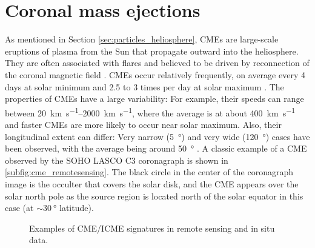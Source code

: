 \section{Coronal mass ejections}
\label{sec:cmes}

As mentioned in Section \ref{sec:particles_heliosphere}, \acp{CME} are large-scale eruptions of plasma from the Sun that propagate outward into the heliosphere. They are often associated with flares and believed to be driven by reconnection of the coronal magnetic field \citep[see e.g.][for discussions on the triggering mechanism]{Forbes-2000,Kusano-2012}. \acp{CME} occur relatively frequently, on average every 4 days at solar minimum and 2.5 to 3 times per day at solar maximum \citep{Webb-1994}. The properties of \acp{CME} have a large variability: For example, their speeds can range between \SIrange[range-phrase={\,and\,}]{20}{2000}{\kilo\meter\per\second}, where the average is at about \SI{400}{\kilo\meter\per\second} and faster \acp{CME} are more likely to occur near solar maximum. Also, their longitudinal extent can differ: Very narrow (\SI{5}{\degree}) and very wide (\SI{120}{\degree}) cases have been observed, with the average being around \SI{50}{\degree} \citep{Cane-2000}. A classic example of a \ac{CME} observed by the \ac{SOHO} \ac{LASCO} C3 coronagraph is shown in \autoref{subfig:cme_remotesensing}. The black circle in the center of the coronagraph image is the occulter that covers the solar disk, and the \ac{CME} appears over the solar north pole as the source region is located north of the solar equator in this case (at $\sim\SI{30}{\degree}$ latitude).

\begin{figure}
    \centering
	\hspace{5mm}
    \caption[Examples of \acs{CME} and \acs{ICME} signatures]{Examples of \acs{CME}/\ac{ICME} signatures in remote sensing and in situ data.}
    \label{fig:cme_icme_signatures}
\end{figure}

